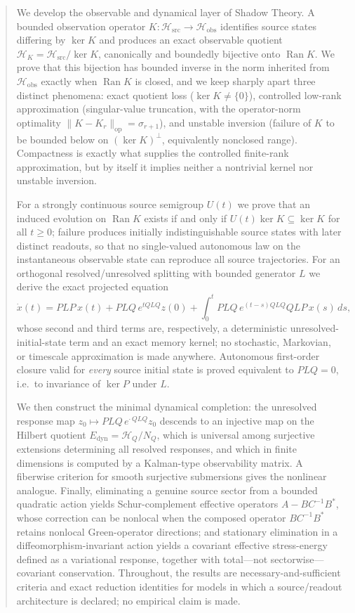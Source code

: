\documentclass[11pt,reqno]{amsart}
\numberwithin{equation}{section}
\theoremstyle{plain}
\theoremstyle{definition}
\theoremstyle{remark}
\newcommand{\Hsrc}{\mathcal{H}_{\mathrm{src}}}
\newcommand{\Hobs}{\mathcal{H}_{\mathrm{obs}}}
\newcommand{\HK}{\mathcal{H}_{K}}
\newcommand{\HQ}{\mathcal{H}_{Q}}
\newcommand{\Ran}{\operatorname{Ran}}
\newcommand{\Edyn}{E_{\mathrm{dyn}}}
\begin{document}
\begin{abstract}
We develop the observable and dynamical layer of Shadow Theory. A bounded observation
operator $K:\Hsrc\to\Hobs$ identifies source states differing by $\ker K$ and produces
an exact observable quotient $\HK=\Hsrc/\ker K$, canonically and boundedly bijective
onto $\Ran K$. We prove that this bijection has bounded inverse in the norm inherited
from $\Hobs$ exactly when $\Ran K$ is closed, and we keep sharply apart three distinct
phenomena: exact quotient loss ($\ker K\neq\{0\}$), controlled low-rank approximation
(singular-value truncation, with the operator-norm optimality
$\lVert K-K_r\rVert_{\mathrm{op}}=\sigma_{r+1}$), and unstable inversion (failure of $K$ to
be bounded below on $(\ker K)^{\perp}$, equivalently nonclosed range). Compactness is
exactly what supplies the controlled finite-rank approximation, but by itself it implies
neither a nontrivial kernel nor unstable inversion.

For a strongly continuous source semigroup $U(t)$ we prove that an induced evolution on
$\Ran K$ exists if and only if $U(t)\ker K\subseteq\ker K$ for all $t\ge 0$; failure
produces initially indistinguishable source states with later distinct readouts, so that
no single-valued autonomous law on the instantaneous observable state can reproduce all
source trajectories. For an orthogonal resolved/unresolved splitting with bounded
generator $L$ we derive the exact projected equation
\[
\dot x(t)=PLP\,x(t)+PLQ\,e^{tQLQ}z(0)
+\int_{0}^{t}PLQ\,e^{(t-s)QLQ}QLP\,x(s)\,ds ,
\]
whose second and third terms are, respectively, a deterministic unresolved-initial-state
term and an exact memory kernel; no stochastic, Markovian, or timescale approximation is
made anywhere. Autonomous first-order closure valid for \emph{every} source initial state
is proved equivalent to $PLQ=0$, i.e.\ to invariance of $\ker P$ under $L$.

We then construct the minimal dynamical completion: the unresolved response map
$z_0\mapsto PLQ\,e^{\cdot\,QLQ}z_0$ descends to an injective map on the
Hilbert quotient $\Edyn=\HQ/N_Q$, which is universal among surjective
extensions determining all resolved responses, and which in finite dimensions
is computed by a Kalman-type observability matrix. A fiberwise criterion for smooth surjective submersions gives the nonlinear
analogue. Finally, eliminating a genuine source sector from a bounded quadratic action
yields Schur-complement effective operators $A-BC^{-1}B^{*}$, whose correction can be
nonlocal when the composed operator $BC^{-1}B^{*}$ retains nonlocal Green-operator
directions; and stationary elimination in a diffeomorphism-invariant action yields a covariant
effective stress-energy defined as a variational response, together with total---not
sectorwise---covariant conservation. Throughout, the results are
necessary-and-sufficient
criteria and exact reduction identities for models in which a source/readout
architecture is declared; no empirical claim is made.
\end{abstract}
\end{document}
